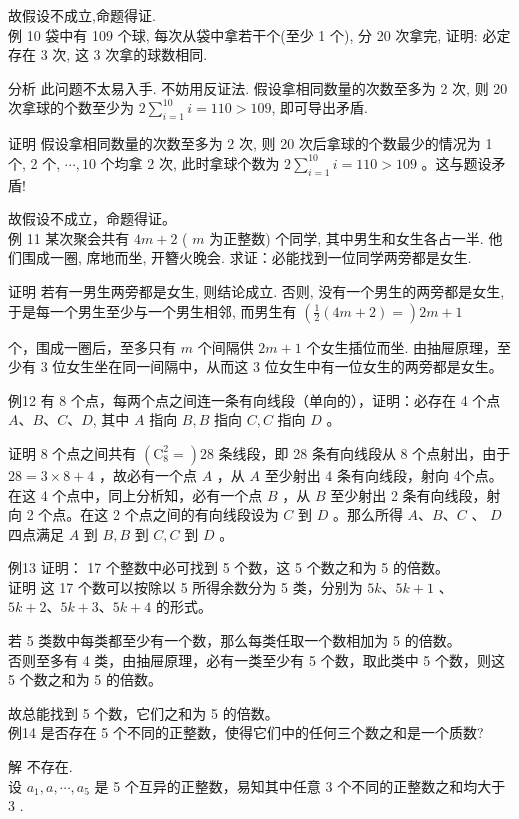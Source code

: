 \documentclass[10pt]{article}
\begin{document}
故假设不成立,命题得证.\\
例 10 袋中有 109 个球, 每次从袋中拿若干个(至少 1 个), 分 20 次拿完, 证明: 必定存在 3 次, 这 3 次拿的球数相同.

分析 此问题不太易入手. 不妨用反证法. 假设拿相同数量的次数至多为 2 次, 则 20 次拿球的个数至少为 $2 \sum_{i=1}^{10} i=110>109$, 即可导出矛盾.

证明 假设拿相同数量的次数至多为 2 次, 则 20 次后拿球的个数最少的情况为 1 个, 2 个, $\cdots, 10$ 个均拿 2 次, 此时拿球个数为 $2 \sum_{i=1}^{10} i=110>109$ 。这与题设矛盾!

故假设不成立，命题得证。\\
例 11 某次聚会共有 $4 m+2$ ( $m$ 为正整数) 个同学, 其中男生和女生各占一半. 他们围成一圈, 席地而坐, 开簪火晚会. 求证：必能找到一位同学两旁都是女生.

证明 若有一男生两旁都是女生, 则结论成立. 否则, 没有一个男生的两旁都是女生, 于是每一个男生至少与一个男生相邻, 而男生有 $\left(\frac{1}{2}(4 m+2)=\right) 2 m+1$

个，围成一圈后，至多只有 $m$ 个间隔供 $2 m+1$ 个女生插位而坐. 由抽屉原理，至少有 3 位女生坐在同一间隔中，从而这 3 位女生中有一位女生的两旁都是女生。

例12 有 8 个点，每两个点之间连一条有向线段（单向的），证明：必存在 4 个点 $A 、 B 、 C 、 D$, 其中 $A$ 指向 $B, B$ 指向 $C, C$ 指向 $D$ 。

证明 8 个点之间共有 $\left(\mathrm{C}_{8}^{2}=\right) 28$ 条线段，即 28 条有向线段从 8 个点射出，由于 $28=3 \times 8+4$ ，故必有一个点 $A$ ，从 $A$ 至少射出 4 条有向线段，射向 4个点。在这 4 个点中，同上分析知，必有一个点 $B$ ，从 $B$ 至少射出 2 条有向线段，射向 2 个点。在这 2 个点之间的有向线段设为 $C$ 到 $D$ 。那么所得 $A 、 B 、 C$ 、 $D$ 四点满足 $A$ 到 $B, B$ 到 $C, C$ 到 $D$ 。

例13 证明： 17 个整数中必可找到 5 个数，这 5 个数之和为 5 的倍数。\\
证明 这 17 个数可以按除以 5 所得余数分为 5 类，分别为 $5 k 、 5 k+1$ 、 $5 k+2 、 5 k+3 、 5 k+4$ 的形式。

若 5 类数中每类都至少有一个数，那么每类任取一个数相加为 5 的倍数。\\
否则至多有 4 类，由抽屉原理，必有一类至少有 5 个数，取此类中 5 个数，则这 5 个数之和为 5 的倍数。

故总能找到 5 个数，它们之和为 5 的倍数。\\
例14 是否存在 5 个不同的正整数，使得它们中的任何三个数之和是一个质数?

解 不存在.\\
设 $a_{1}, a, \cdots, a_{5}$ 是 5 个互异的正整数，易知其中任意 3 个不同的正整数之和均大于 3 .
\end{document}
